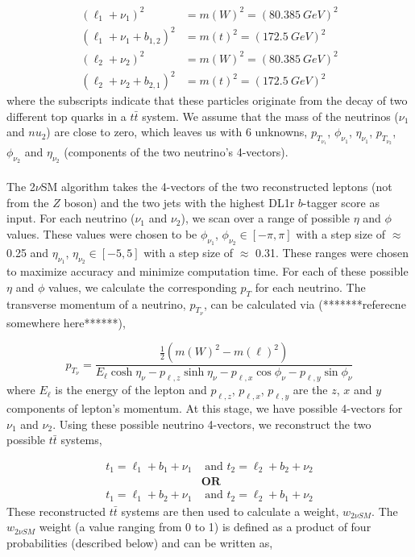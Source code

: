 \begin{align}
    (\ell_{1} + \nu_{1})^{2} &= m(W)^{2} = (\SI{80.385}{GeV})^2\\
    (\ell_{1} + \nu_{1} + b_{1,2})^{2} &= m(t)^{2} = (\SI{172.5}{GeV})^{2}\\
    (\ell_{2} + \nu_{2})^{2} &= m(W)^{2} = (\SI{80.385}{GeV})^2\\
       (\ell_{2} + \nu_{2} + b_{2,1})^{2} &= m(t)^{2} = (\SI{172.5}{GeV})^{2}
\end{align}
where the subscripts indicate that these particles originate from the decay of two different top quarks in a $t\bar{t}$ system. We assume that the mass of the neutrinos ($\nu_{1}$ and $nu_{2}$) are close to zero, which leaves us with 6 unknowns, $p_{{T}_{\nu_{1}}}$, $\phi_{\nu_{1}}$, $\eta_{\nu_{1}}$, $p_{{T}_{\nu_{2}}}$, $\phi_{\nu_{2}}$ and $\eta_{\nu_{2}}$ (components of the two neutrino's 4-vectors).\\\\
The 2$\nu$SM algorithm takes the 4-vectors of the two reconstructed leptons (not from the $Z$ boson) and the two jets with the highest DL1r $b$-tagger score as input. For each neutrino ($\nu_{1}$ and $\nu_{2}$), we scan over a range of possible $\eta$ and $\phi$ values. These values were chosen to be $\phi_{\nu_{1}}$, $\phi_{\nu_{2}} \in [-\pi,\pi]$ with a step size of $\approx$ 0.25 and $\eta_{\nu_{1}}$, $\eta_{\nu_{2}} \in [-5,5]$ with a step size of $\approx$ 0.31. These ranges were chosen to maximize accuracy and minimize computation time. For each of these possible $\eta$ and $\phi$ values, we calculate the corresponding $p_{T}$ for each neutrino. The transverse momentum of a neutrino, $p_{{T}_{\nu}}$, can be calculated via (*******referecne somewhere here******),

\begin{equation}
    p_{{T}_{\nu}} = \frac{\frac{1}{2} (m(W)^{2} - m(\ell)^{2})}{E_{\ell}\cosh{\eta_{\nu}} - p_{\ell,z}\sinh{\eta_{\nu}} - p_{\ell,x}\cos{\phi_{\nu}} - p_{\ell,y}\sin{\phi_{\nu}} }
\end{equation}
where $E_{\ell}$ is the energy of the lepton and $p_{\ell, z}$, $p_{\ell, x}$, $p_{\ell, y}$ are the $z$, $x$ and $y$ components of lepton's momentum. At this stage, we have possible 4-vectors for $\nu_{1}$ and $\nu_{2}$. Using these possible neutrino 4-vectors, we reconstruct the two possible $t\bar{t}$ systems,

\begin{align}
    t_{1} = \ell_{1} + b_{1} + \nu_{1} &\text{ and } t_{2} = \ell_{2} + b_{2} + \nu_{2} \label{eq:top1-2vSM}\\
    &\textbf{OR}\nonumber\\ 
     t_{1} = \ell_{1} + b_{2} + \nu_{1} &\text{ and } t_{2} = \ell_{2} + b_{1} + \nu_{2} \label{eq:top2-2vSM}
\end{align}
These reconstructed $t\bar{t}$ systems are then used to calculate a weight, $w_{2\nu SM}$. The $w_{2\nu SM}$ weight (a value ranging from 0 to 1) is defined as a product of four probabilities (described below) and can be written as,

